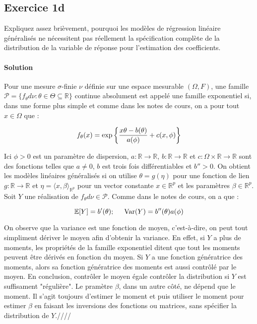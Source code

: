 \documentclass[../main.tex]{subfiles}
\begin{document}
\begin{CJK*}{UTF8}{gbsn}
\section*{Exercice 1d}
Expliquez assez brièvement, pourquoi les modèles de régression linéaire généralisés
ne nécessitent pas réellement la spécification complète de la distribution de
la variable de réponse pour l’estimation des coefficients.

\paragraph{Solution}
Pour une mesure $\sigma$-finie $\nu$ définie sur une espace mesurable $(\Omega, F)$,
une famille $\mathcal{P} = \{f_{\theta}d\nu : \theta \in \Theta \subseteq \mathbb{R}\}$ continue 
absolument est appelé une famille exponentiel si, 
dans une forme plus simple et comme dans les notes de cours, on a pour tout $x \in \Omega$ que :

\begin{equation*}
    f_{\theta}(x) = \exp\curly{\frac{x\theta -b(\theta)}{a(\phi)} + c(x, \phi)}
\end{equation*}

Ici $\phi > 0$ est un paramètre de dispersion, $a : \mathbb{R} \to \mathbb{R}$,
$b : \mathbb{R} \to \mathbb{R}$ et $c : \Omega \times \mathbb{R} \to \mathbb{R}$ 
sont des fonctions telles que $a \neq 0$, $b$ est trois fois différentiables et $b'' > 0$.
On obtient les modèles linéaires généralisés si on utilise $\theta = g(\eta)$ pour 
une fonction de lien $g: \mathbb{R} \to \mathbb{R}$ et $\eta = \langle x , \beta \rangle_{\mathbb{R}^p}$ 
pour un vector constante $x \in \mathbb{R}^p$ et les paramètres $\beta \in \mathbb{R}^p$.
Soit $Y$ une réalisation de $f_{\theta} d \nu \in \mathcal{P}$.
Comme dans le notes de cours, on a que :

\begin{equation*}
    \mathbb{E}[Y] = b'(\theta); \tab[0.5cm] \text{Var}(Y) = b''(\theta) a(\phi)
\end{equation*}

On observe que la variance est une fonction de moyen, c'est-à-dire, on peut tout simpliment
dériver le moyen afin d'obtenir la variance. En effet, si $Y$ a plus de moments, 
les propriétés de la famille exponentiel ditent que tout les moments peuvent être dérivés
en fonction du moyen. Si $Y$ a une fonction génératrice des moments, 
alors sa fonction génératrice des moments est aussi contrôlé par le moyen.
En conclusion, contrôler le moyen égale contrôler la distribution si $Y$ est suffisament "régulière".
Le pramètre $\beta$, dans un autre côté, ne dépend que le moment. 
Il s'agit toujours d'estimer le moment et puis utiliser le moment pour estimer $\beta$
en faisant les inversions des fonctions ou matrices, sans spécifier la distribution de $Y$.////

\end{CJK*}
\end{document}
